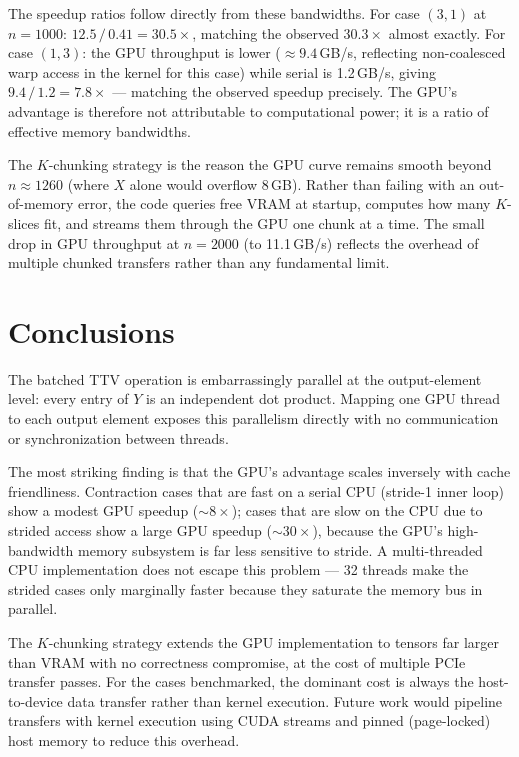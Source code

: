 \documentclass[11pt]{article}
\begin{document}
The speedup ratios follow directly from these bandwidths.  For case $(3,1)$
at $n{=}1000$: $12.5\,/\,0.41 = 30.5\times$, matching the observed
$30.3\times$ almost exactly.  For case $(1,3)$: the GPU throughput is
lower (${\approx}9.4$\,GB/s, reflecting non-coalesced warp access in the
kernel for this case) while serial is 1.2\,GB/s, giving
$9.4\,/\,1.2 = 7.8\times$ --- matching the observed speedup precisely.
The GPU's advantage is therefore not attributable to computational power;
it is a ratio of effective memory bandwidths.

The $K$-chunking strategy is the reason the GPU curve remains smooth
beyond $n{\approx}1260$ (where $X$ alone would overflow 8\,GB).  Rather
than failing with an out-of-memory error, the code queries free VRAM at
startup, computes how many $K$-slices fit, and streams them through the
GPU one chunk at a time.  The small drop in GPU throughput at $n{=}2000$
(to 11.1\,GB/s) reflects the overhead of multiple chunked transfers
rather than any fundamental limit.

\section{Conclusions}

The batched TTV operation is embarrassingly parallel at the output-element
level: every entry of $Y$ is an independent dot product.  Mapping one GPU
thread to each output element exposes this parallelism directly with no
communication or synchronization between threads.

The most striking finding is that the GPU's advantage scales inversely
with cache friendliness.  Contraction cases that are fast on a serial CPU
(stride-1 inner loop) show a modest GPU speedup (${\sim}8\times$);
cases that are slow on the CPU due to strided access show a large GPU
speedup (${\sim}30\times$), because the GPU's high-bandwidth memory
subsystem is far less sensitive to stride.  A multi-threaded CPU
implementation does not escape this problem --- 32 threads make the
strided cases only marginally faster because they saturate the memory
bus in parallel.

The $K$-chunking strategy extends the GPU implementation to tensors far
larger than VRAM with no correctness compromise, at the cost of multiple
PCIe transfer passes.  For the cases benchmarked, the dominant cost is
always the host-to-device data transfer rather than kernel execution.
Future work would pipeline transfers with kernel execution using CUDA
streams and pinned (page-locked) host memory to reduce this overhead.
\end{document}
